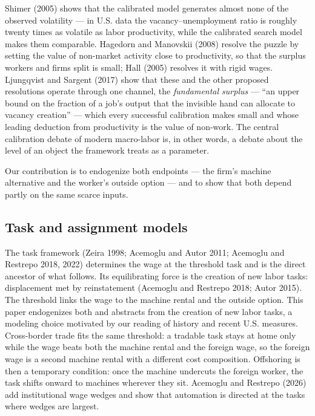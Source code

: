 \documentclass[12pt]{article}
\theoremstyle{plain}
\begin{document}
Shimer (2005) shows that the calibrated model generates almost none of the observed volatility --- in U.S. data the vacancy--unemployment ratio is roughly twenty times as volatile as labor productivity, while the calibrated search model makes them comparable. Hagedorn and Manovskii (2008) resolve the puzzle by setting the value of non-market activity close to productivity, so that the surplus workers and firms split is small; Hall (2005) resolves it with rigid wages. Ljungqvist and Sargent (2017) show that these and the other proposed resolutions operate through one channel, the \emph{fundamental surplus} --- ``an upper bound on the fraction of a job's output that the invisible hand can allocate to vacancy creation'' --- which every successful calibration makes small and whose leading deduction from productivity is the value of non-work. The central calibration debate of modern macro-labor is, in other words, a debate about the level of an object the framework treats as a parameter.

Our contribution is to endogenize both endpoints --- the firm's machine alternative and the worker's outside option --- and to show that both depend partly on the same scarce inputs.

\subsection{Task and assignment models}\label{sec:2.3}

The task framework (Zeira 1998; Acemoglu and Autor 2011; Acemoglu and Restrepo 2018, 2022) determines the wage at the threshold task and is the direct ancestor of what follows. Its equilibrating force is the creation of new labor tasks: displacement met by reinstatement (Acemoglu and Restrepo 2018; Autor 2015). The threshold links the wage to the machine rental and the outside option. This paper endogenizes both and abstracts from the creation of new labor tasks, a modeling choice motivated by our reading of history and recent U.S. measures. Cross-border trade fits the same threshold: a tradable task stays at home only while the wage beats both the machine rental and the foreign wage, so the foreign wage is a second machine rental with a different cost composition. Offshoring is then a temporary condition: once the machine undercuts the foreign worker, the task shifts onward to machines wherever they sit. Acemoglu and Restrepo (2026) add institutional wage wedges and show that automation is directed at the tasks where wedges are largest.
\end{document}
